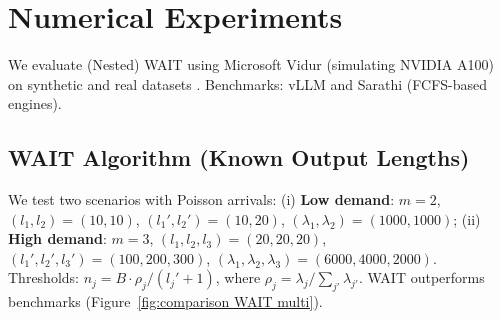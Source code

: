 \section{Numerical Experiments}
\label{sec:experiments}

We evaluate (Nested) WAIT using Microsoft Vidur (simulating NVIDIA A100) \citep{agrawal2024vidur} on synthetic and real datasets \cite{zheng2023lmsys}. Benchmarks: vLLM \citep{kwon2023efficient} and Sarathi \citep{agrawal2023sarathi} (FCFS-based engines).

\subsection{WAIT Algorithm (Known Output Lengths)}
We test two scenarios with Poisson arrivals:
(i) \textbf{Low demand}: \( m=2 \), \( (l_1, l_2) = (10, 10) \), \( (l_1', l_2') = (10, 20) \), \( (\lambda_1, \lambda_2) = (1000, 1000) \);
(ii) \textbf{High demand}: \( m=3 \), \( (l_1, l_2, l_3) = (20, 20, 20) \), \( (l_1', l_2', l_3') = (100, 200, 300) \), \( (\lambda_1, \lambda_2, \lambda_3) = (6000, 4000, 2000) \).
Thresholds: \( n_j = B \cdot \rho_j / (l_j' + 1) \), where \( \rho_j = \lambda_j / \sum_{j'} \lambda_{j'} \). WAIT outperforms benchmarks (Figure~\ref{fig:comparison WAIT multi}).

